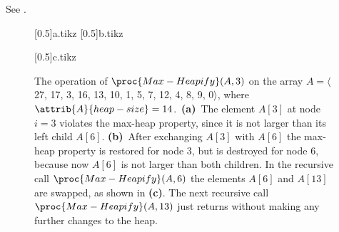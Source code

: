 See .
\begin{figure}[htb]
    \subcaptionbox{\label{fig:6.2-1a}}[0.5\textwidth]{{a.tikz}}
    \subcaptionbox{\label{fig:6.2-1b}}[0.5\textwidth]{{b.tikz}}
    \par\vspace{\vertexsize}
    \subcaptionbox{\label{fig:6.2-1c}}[0.5\textwidth]{{c.tikz}}
    \caption{The operation of $\proc{Max-Heapify}(A,3)$ on the array $A=\langle$27, 17, 3, 16, 13, 10, 1, 5, 7, 12, 4, 8, 9, 0$\rangle$, where $\attrib{A}{heap-size}=14$.\,
    \textbf{(a)}\, The element $A[3]$ at node $i=3$ violates the max-heap property, since it is not larger than its left child $A[6]$.
    \textbf{(b)}\, After exchanging $A[3]$ with $A[6]$ the max-heap property is restored for node 3, but is destroyed for node 6, because now $A[6]$ is not larger than both children.
    In the recursive call $\proc{Max-Heapify}(A,6)$ the elements $A[6]$ and $A[13]$ are swapped, as shown in \textbf{(c)}.
    The next recursive call $\proc{Max-Heapify}(A,13)$ just returns without making any further changes to the heap.} \label{fig:6.2-1}
\end{figure}
